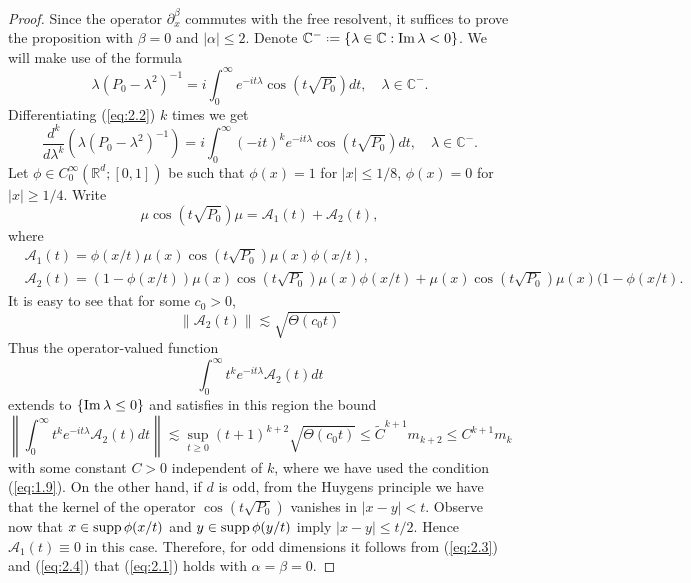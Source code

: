 \documentclass[11pt]{amsart}
\numberwithin{equation}{section}
\newcommand*{\defeq}{\mathrel{\vcenter{\baselineskip0.5ex \lineskiplimit0pt

                     \hbox{\scriptsize.}\hbox{\scriptsize.}}}%
                     =}
\begin{document}
 \begin{proof}
 Since the operator 
$\partial_x^\beta$ commutes with the free resolvent, it suffices to prove the proposition with $\beta=0$ and $|\alpha|\le 2$.
 Denote $\mathbb{C}^- \defeq \{\lambda\in\mathbb{C}:{\rm Im}\,\lambda<0\}$. 
  We will make use of the formula
\begin{equation}\label{eq:2.2}
\lambda(P_0-\lambda^2)^{-1}=i\int_0^\infty e^{-it\lambda}\cos\left(t\sqrt{P_0}\right)dt,\quad \lambda\in\mathbb{C}^-.
\end{equation}
 Differentiating (\ref{eq:2.2}) $k$ times we get
\begin{equation}\label{eq:2.3}
\frac{d^k}{d\lambda^k}\left(\lambda(P_0-\lambda^2)^{-1}\right)=i\int_0^\infty (-it)^ke^{-it\lambda}\cos\left(t\sqrt{P_0}\right)dt
,\quad \lambda\in\mathbb{C}^-.
\end{equation}
Let $\phi\in C_0^\infty(\mathbb{R}^d ; [0,1])$ be such that $\phi(x)=1$ for $|x|\le 1/8$,
$\phi(x)=0$ for $|x|\ge 1/4$. Write
\begin{equation*}
\mu\cos\left(t\sqrt{P_0}\right)\mu=\mathcal{A}_1(t)+\mathcal{A}_2(t),
\end{equation*}
where 
\begin{align*}
& \mathcal{A}_1(t)=\phi(x/t)\mu(x)\cos\left(t\sqrt{P_0}\right)\mu(x)\phi(x/t),\\
& \mathcal{A}_2(t)=(1-\phi(x/t))\mu(x)\cos\left(t\sqrt{P_0}\right)\mu(x)\phi(x/t)
+\mu(x)\cos\left(t\sqrt{P_0}\right)\mu(x)(1-\phi(x/t).
\end{align*}
It is easy to see that for some $c_0 > 0$,
\begin{equation*}
\|\mathcal{A}_2(t)\|\lesssim\sqrt{\Theta(c_0t)}
\end{equation*}
Thus the operator-valued function
\begin{equation*}
\int_0^\infty t^ke^{-it\lambda}\mathcal{A}_2(t)dt
\end{equation*}
extends to $\{{\rm Im}\,\lambda\le 0\}$ and satisfies in this region the bound
\begin{equation}\label{eq:2.4}
\left\|\int_0^\infty t^ke^{-it\lambda}\mathcal{A}_2(t)dt\right\|\lesssim \sup_{t\ge 0}(t+1)^{k+2}\sqrt{\Theta(c_0t)}\le
\widetilde C^{k+1}m_{k+2}\le C^{k+1}m_{k}
\end{equation}
with some constant $C>0$ independent of $k$, where we have used the condition (\ref{eq:1.9}).
On the other hand, if $d$ is odd, 
from the Huygens principle we have that the kernel of the operator
$\cos\left(t\sqrt{P_0}\right)$ vanishes in $|x-y|<t$. Observe now that $x\in {\rm supp}\,\phi(x/t)$ and
$y\in {\rm supp}\,\phi(y/t)$ imply $|x-y|\le t/2$. 
Hence $\mathcal{A}_1(t)\equiv 0$ in this case. Therefore, for odd dimensions it follows from
(\ref{eq:2.3}) and (\ref{eq:2.4}) that (\ref{eq:2.1}) holds with $\alpha=\beta=0$.


\end{proof}
\end{document}
